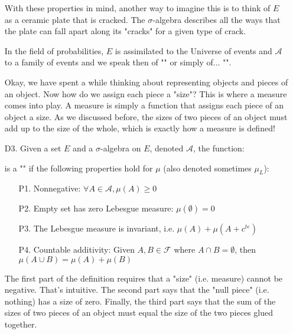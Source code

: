 \begin{enumerate}
	With these properties in mind, another way to imagine this is to think of $E$ as a ceramic plate that is cracked. The $\sigma$-algebra describes all the ways that the plate can fall apart along its "cracks" for a given type of crack. 
	\begin{tcolorbox}[title=Remark,arc=10pt,breakable,drop lifted shadow,
  skin=enhanced,
  skin first is subskin of={enhancedfirst}{arc=10pt,no shadow},
  skin middle is subskin of={enhancedmiddle}{arc=10pt,no shadow},
  skin last is subskin of={enhancedlast}{drop lifted shadow}]
	In the field of probabilities, $E$ is assimilated to the Universe of events and $\mathcal{A}$ to a family of events and we speak then of "" or simply of... "".
	\end{tcolorbox}	
	
	Okay, we have spent a while thinking about representing objects and pieces of an object. Now how do we assign each piece a "size"? This is where a measure comes into play. A measure is simply a function that assigns each piece of an object a size. As we discussed before, the sizes of two pieces of an object must add up to the size of the whole, which is exactly how a measure is defined!
	
	\item[D3.] Given a set $E$ and a $\sigma$-algebra on $E$, denoted $\mathcal{A}$, the function:
	
	is a "\label{measure}" if the following properties hold for $\mu$ (also denoted sometimes $\mu_L$):
	\begin{enumerate}
		\item[P1.] Nonnegative: $\forall A \in \mathcal{A}, \mu(A) \geq 0$
		
		\item[P2.] Empty set has zero Lebesgue measure: $\mu(\emptyset)=0$
		
		\item[P3.] The Lebesgue measure is invariant, i.e. $\mu(A)+\mu(A+c^{te})$
		
		\item[P4.] Countable additivity: Given $A, B \in \mathcal{F}$ where $A \cap B=\emptyset$, then $\mu(A \cup B)=\mu(A)+\mu(B)$
	\end{enumerate}
	The first part of the definition requires that a "size" (i.e. measure) cannot be negative. That's intuitive. The second part says that the "null piece" (i.e. nothing) has a size of zero. Finally, the third part says that the sum of the sizes of two pieces of an object must equal the size of the two pieces glued together.
		

\end{enumerate}
